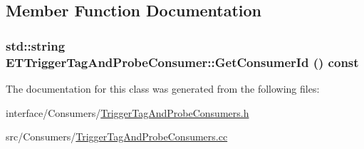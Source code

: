 \subsection{Member Function Documentation}
\hypertarget{classETTriggerTagAndProbeConsumer_ab7ff099dd475a066450c68ab593bddf4}{
\subsubsection[{GetConsumerId}]{\setlength{\rightskip}{0pt plus 5cm}std::string ETTriggerTagAndProbeConsumer::GetConsumerId () const}}
\label{classETTriggerTagAndProbeConsumer_ab7ff099dd475a066450c68ab593bddf4}


The documentation for this class was generated from the following files:\begin{DoxyCompactItemize}
\item 
interface/Consumers/\hyperlink{TriggerTagAndProbeConsumers_8h}{TriggerTagAndProbeConsumers.h}\item 
src/Consumers/\hyperlink{TriggerTagAndProbeConsumers_8cc}{TriggerTagAndProbeConsumers.cc}\end{DoxyCompactItemize}
